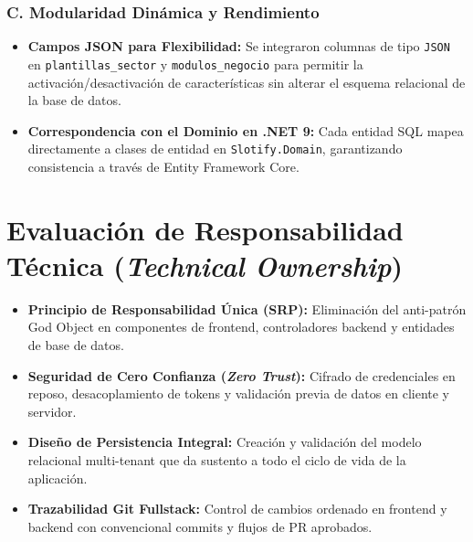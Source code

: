 \documentclass[11pt,letterpaper]{article}
\begin{document}
\subsubsection{C. Modularidad Dinámica y Rendimiento}
\begin{itemize}[leftmargin=0.8cm]
    \item \textbf{Campos JSON para Flexibilidad:} Se integraron columnas de tipo \texttt{JSON} en \texttt{plantillas\_sector} y \texttt{modulos\_negocio} para permitir la activación/desactivación de características sin alterar el esquema relacional de la base de datos.
    \item \textbf{Correspondencia con el Dominio en .NET 9:} Cada entidad SQL mapea directamente a clases de entidad en \texttt{Slotify.Domain}, garantizando consistencia a través de Entity Framework Core.
\end{itemize}

\section{Evaluación de Responsabilidad Técnica (\textit{Technical Ownership})}
\begin{itemize}[leftmargin=0.8cm]
    \item \textbf{Principio de Responsabilidad Única (SRP):} Eliminación del anti-patrón God Object en componentes de frontend, controladores backend y entidades de base de datos.
    \item \textbf{Seguridad de Cero Confianza (\textit{Zero Trust}):} Cifrado de credenciales en reposo, desacoplamiento de tokens y validación previa de datos en cliente y servidor.
    \item \textbf{Diseño de Persistencia Integral:} Creación y validación del modelo relacional multi-tenant que da sustento a todo el ciclo de vida de la aplicación.
    \item \textbf{Trazabilidad Git Fullstack:} Control de cambios ordenado en frontend y backend con convencional commits y flujos de PR aprobados.
\end{itemize}
\end{document}
